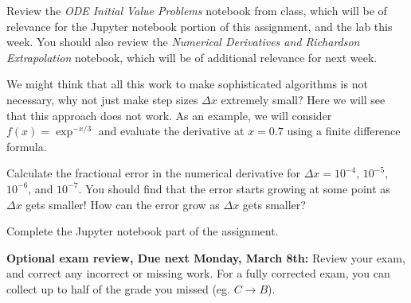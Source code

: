 \documentclass[]{homework}
\begin{document}

\begin{problem}{1}
  Review the {\em ODE Initial Value Problems} notebook from class, which will be of relevance for the Jupyter notebook portion of this assignment, and the lab this week. You should also review the {\em Numerical Derivatives and Richardson Extrapolation} notebook, which will be of additional relevance for next week.
\end{problem}

\begin{problem}{2}
  We might think that all this work to make sophisticated algorithms is not necessary, why not just make
  step sizes $\Delta x$ extremely small?
  Here we will see that this approach does not work.
  As an example, we will consider $f(x)=\exp^{-x/3}$ and evaluate the derivative at $x=0.7$ using a finite difference formula.
  
  Calculate the fractional error in the numerical derivative for $\Delta x=10^{-4}$, $10^{-5}$, $10^{-6}$, and $10^{-7}$.
  You should find that the error starts growing at some point as $\Delta x$ gets smaller! How can the error grow as $\Delta x$ gets smaller?
  
\end{problem}

\begin{problem}{3}
  Complete the Jupyter notebook part of the assignment.
\end{problem}

\vspace{1cm}

{\bf Optional exam review, Due next Monday, March 8th:} Review your exam, and correct any incorrect or missing work.
For a fully corrected exam, you can collect up to half of the grade you missed (eg. $C \rightarrow B$).
\end{document}
